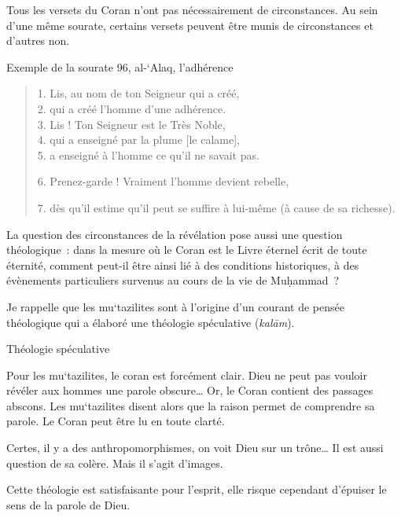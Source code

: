 Tous les versets du Coran n'ont pas nécessairement de circonstances. Au
sein d'une même sourate, certains versets peuvent être munis de
circonstances et d'autres non.

Exemple de la sourate 96, al-`Alaq, l'adhérence
\begin{quote}
   1. Lis, au nom de ton Seigneur qui a créé,\\
2. qui a créé l'homme d'une adhérence.\\
3. Lis ! Ton Seigneur est le Très Noble,\\
4. qui a enseigné par la plume {[}le calame{]},\\
5. a enseigné à l'homme ce qu'il ne savait pas.

6. Prenez-garde ! Vraiment l'homme devient rebelle,

7. dès qu'il estime qu'il peut se suffire à lui-même (à cause de sa
richesse). 
\end{quote}


La question des circonstances de la révélation pose aussi une question
théologique~: dans la mesure où le Coran est le Livre éternel écrit de
toute éternité, comment peut-il être ainsi lié à des conditions
historiques, à des évènements particuliers survenus au cours de la vie
de Muḥammad~?


Je rappelle que les mu`tazilites sont à l'origine d'un courant de pensée
théologique qui a élaboré une théologie spéculative (\emph{kalām}).
\label{Def:kalam}
\begin{Def}[kalām]
Théologie spéculative
\end{Def}
Pour les mu`tazilites, le coran est forcément clair. Dieu ne peut pas
vouloir révéler aux hommes une parole obscure\ldots{} Or, le Coran
contient des passages abscons. Les mu`tazilites disent alors que la
raison permet de comprendre sa parole. Le Coran peut être lu en toute
clarté.

Certes, il y a des anthropomorphismes, on voit Dieu sur un trône\ldots{}
Il est aussi question de sa colère. Mais il s'agit d'images.

Cette théologie est satisfaisante pour l'esprit, elle risque cependant
d'épuiser le sens de la parole de Dieu.

